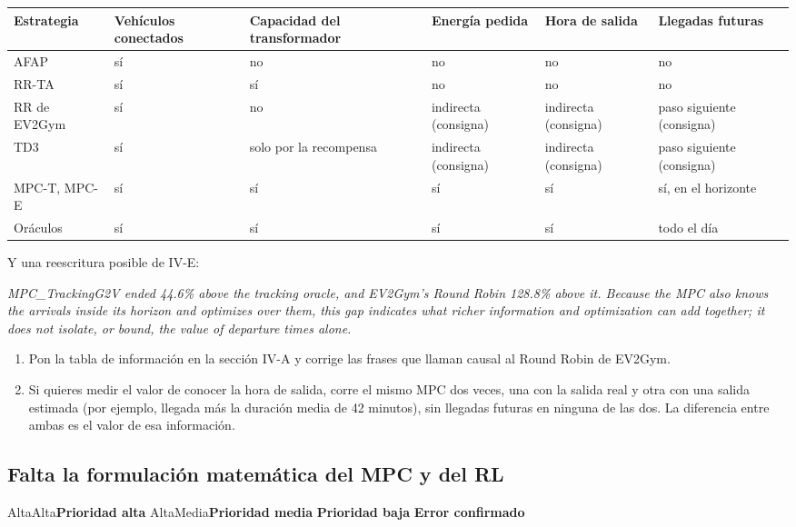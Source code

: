 \documentclass[11pt]{article}
\newcommand{\prioridad}[1]{%
  \def\tmpA{Alta}\def\tmpM{Media}\def\tmp{#1}%
  \ifx\tmp\tmpA\colorbox{rojoerror}{\color{white}\small\bfseries Prioridad alta}%
  \else\ifx\tmp\tmpM\colorbox{naranjatarea}{\color{white}\small\bfseries Prioridad media}%
  \else\colorbox{azulidea}{\color{white}\small\bfseries Prioridad baja}\fi\fi}
\newcommand{\confirmado}{\colorbox{rojoerror!15}{\small\bfseries\color{rojoerror} Error confirmado}}
\newenvironment{eng}{\begin{otherlanguage}{english}\itshape}{\end{otherlanguage}}
\begin{document}
\begin{ejemplo}
\begin{center}
\small
\begin{tabularx}{\linewidth}{@{}lXXXXX@{}}
\toprule
Estrategia & Vehículos conectados & Capacidad del transformador & Energía pedida & Hora de salida & Llegadas futuras \\
\midrule
AFAP & sí & no & no & no & no \\
RR-TA & sí & sí & no & no & no \\
RR de EV2Gym & sí & no & indirecta (consigna) & indirecta (consigna) & paso siguiente (consigna) \\
TD3 & sí & solo por la recompensa & indirecta (consigna) & indirecta (consigna) & paso siguiente (consigna) \\
MPC-T, MPC-E & sí & sí & sí & sí & sí, en el horizonte \\
Oráculos & sí & sí & sí & sí & todo el día \\
\bottomrule
\end{tabularx}
\end{center}
Y una reescritura posible de IV-E:

\begin{eng}
MPC\_TrackingG2V ended 44.6\% above the tracking oracle, and EV2Gym's Round Robin 128.8\% above it. Because the MPC also knows the arrivals inside its horizon and optimizes over them, this gap indicates what richer information and optimization can add together; it does not isolate, or bound, the value of departure times alone.
\end{eng}
\end{ejemplo}

\begin{tarea}
\begin{enumerate}
\item Pon la tabla de información en la sección IV-A y corrige las frases que llaman causal al Round Robin de EV2Gym.
\item Si quieres medir el valor de conocer la hora de salida, corre el mismo MPC dos veces, una con la salida real y otra con una salida estimada (por ejemplo, llegada más la duración media de 42 minutos), sin llegadas futuras en ninguna de las dos. La diferencia entre ambas es el valor de esa información.
\end{enumerate}
\end{tarea}

\subsection{Falta la formulación matemática del MPC y del RL}
\prioridad{Alta} \confirmado
\end{document}
